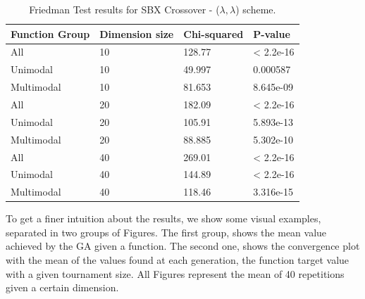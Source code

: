 \begin{table}[h]
	\centering
	\begin{tabular}{|l|l|l|l|}
		\hline
		\textbf{Function Group} & \textbf{Dimension size}      & \textbf{Chi-squared}        & \textbf{P-value}                     \\ \hline
		\multicolumn{1}{|l|}{All} & \multicolumn{1}{|l|}{10} & \multicolumn{1}{l|}{128.77} & \multicolumn{1}{l|}{< 2.2e-16} \\ \hline
		\multicolumn{1}{|l|}{Unimodal} & \multicolumn{1}{|l|}{10} & \multicolumn{1}{l|}{49.997} & \multicolumn{1}{l|}{0.000587} \\ \hline
		\multicolumn{1}{|l|}{Multimodal} & \multicolumn{1}{|l|}{10} & \multicolumn{1}{l|}{81.653} & \multicolumn{1}{l|}{8.645e-09}  \\ \hline
		\hline
		\multicolumn{1}{|l|}{All} & \multicolumn{1}{|l|}{20} & \multicolumn{1}{l|}{182.09} & \multicolumn{1}{l|}{< 2.2e-16} \\ \hline
		\multicolumn{1}{|l|}{Unimodal} & \multicolumn{1}{|l|}{20} & \multicolumn{1}{l|}{105.91} & \multicolumn{1}{l|}{5.893e-13} \\ \hline
		\multicolumn{1}{|l|}{Multimodal} & \multicolumn{1}{|l|}{20} & \multicolumn{1}{l|}{88.885} & \multicolumn{1}{l|}{5.302e-10}  \\ \hline
		\hline
		\multicolumn{1}{|l|}{All} & \multicolumn{1}{|l|}{40} & \multicolumn{1}{l|}{269.01} & \multicolumn{1}{l|}{< 2.2e-16} 						\\ \hline
		\multicolumn{1}{|l|}{Unimodal} & \multicolumn{1}{|l|}{40} & \multicolumn{1}{l|}{144.89} & \multicolumn{1}{l|}{< 2.2e-16} \\ \hline
		\multicolumn{1}{|l|}{Multimodal} & \multicolumn{1}{|l|}{40} & \multicolumn{1}{l|}{118.46} & \multicolumn{1}{l|}{3.316e-15}  \\ \hline
	\end{tabular}
	\caption{Friedman Test results for SBX Crossover - ($\lambda, \lambda$) scheme.}
	\label{Friedman_test_sbx-a}	
\end{table}



To get a finer intuition about the results, we show  some visual examples, separated in two groups of Figures. The first group, shows the mean value achieved by the GA given a function. The second one, shows the convergence plot with the mean of the values found at each generation, the function target value with a given tournament size. All Figures represent the mean of 40 repetitions given a certain dimension.



